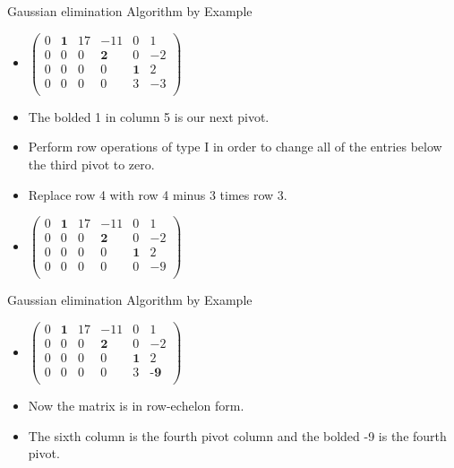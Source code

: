 \documentclass{beamer}
\begin{document}
\begin{frame}{Gaussian elimination Algorithm by Example}

\begin{itemize}
\item $
\begin{pmatrix}
0 & \textbf{1} &  17   &          -11   &          0   &    1  \\
0 &         0  &   0   &   \textbf{2}   &          0   &   -2  \\
0 &         0  &   0   &           0    &  \textbf{1}  &   2  \\
0 &         0  &   0   &           0    &          3   &   -3  \\
\end{pmatrix}
$
\item The bolded 1 in column 5 is our next pivot.
\item Perform row operations of type I in order to change all of the
entries below the third pivot to zero.
\item Replace row 4 with row 4 minus 3 times row 3.
\item $
\begin{pmatrix}
0 & \textbf{1} &  17   &          -11   &          0   &    1  \\
0 &         0  &   0   &   \textbf{2}   &          0   &   -2  \\
0 &         0  &   0   &           0    &  \textbf{1}  &   2  \\
0 &         0  &   0   &           0    &          0   &   -9  \\
\end{pmatrix}
$
\end{itemize}
\end{frame}


\begin{frame}{Gaussian elimination Algorithm by Example}

\begin{itemize}
\item $
\begin{pmatrix}
0 & \textbf{1} &  17   &          -11   &          0   &          1  \\
0 &         0  &   0   &   \textbf{2}   &          0   &          -2  \\
0 &         0  &   0   &           0    &  \textbf{1}  &           2  \\
0 &         0  &   0   &           0    &          3   &   \textbf{-9 } \\
\end{pmatrix}
$
\item Now the matrix is in row-echelon form.
\item The sixth column is the fourth pivot column and the bolded -9 is the
fourth pivot.
\end{itemize}
\end{frame}
\end{document}
